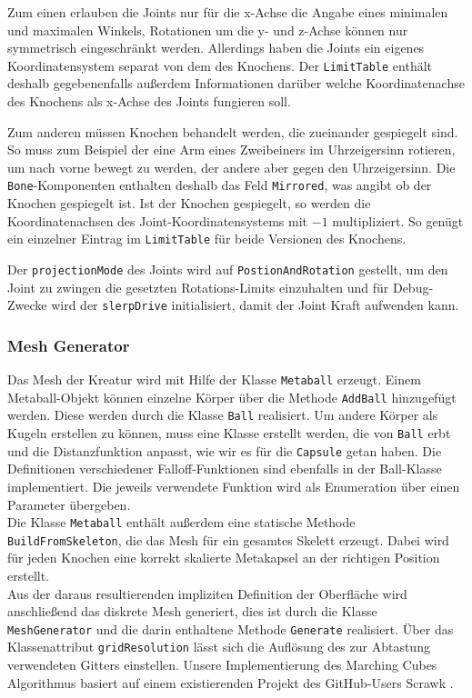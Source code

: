 Zum einen erlauben die Joints nur für die x-Achse die Angabe eines minimalen und maximalen Winkels, Rotationen um die y- und z-Achse können nur symmetrisch eingeschränkt werden.
Allerdings haben die Joints ein eigenes Koordinatensystem separat von dem des Knochens.
Der \texttt{Limit\-Table} enthält deshalb gegebenenfalls außerdem Informationen darüber welche Koordinatenachse des Knochens als x-Achse des Joints fungieren soll.

Zum anderen müssen Knochen behandelt werden, die zueinander gespiegelt sind. So muss zum Beispiel der eine Arm eines Zweibeiners im Uhrzeigersinn rotieren, um nach vorne bewegt zu werden, der andere aber gegen den Uhrzeigersinn. Die \texttt{Bone}-Komponenten enthalten deshalb das Feld \texttt{Mirrored}, was angibt ob der Knochen gespiegelt ist. Ist der Knochen gespiegelt, so werden die Koordinatenachsen des Joint-Koordinatensystems mit \(-1\) multipliziert. So genügt ein einzelner Eintrag im \texttt{Limit\-Table} für beide Versionen des Knochens.

Der \texttt{projectionMode} des Joints wird auf \texttt{Postion\-And\-Rotation} gestellt, um den Joint zu zwingen die gesetzten Rotations-Limits einzuhalten und für Debug-Zwecke wird der \texttt{slerpDrive} initialisiert, damit der Joint Kraft aufwenden kann.

\subsubsection{Mesh Generator}
Das Mesh der Kreatur wird mit Hilfe der Klasse \texttt{Metaball} erzeugt. Einem Metaball-Objekt können einzelne Körper über die Methode \texttt{AddBall} hinzugefügt werden. Diese werden durch die Klasse \texttt{Ball} realisiert. Um andere Körper als Kugeln erstellen zu können, muss eine Klasse erstellt werden, die von \texttt{Ball} erbt und die Distanzfunktion anpasst, wie wir es für die \texttt{Capsule} getan haben. Die Definitionen verschiedener Falloff-Funktionen sind ebenfalls in der Ball-Klasse implementiert. Die jeweils verwendete Funktion wird als Enumeration über einen Parameter übergeben.\\
Die Klasse \texttt{Metaball} enthält außerdem eine statische Methode \texttt{BuildFromSkeleton}, die das Mesh für ein gesamtes Skelett erzeugt. Dabei wird für jeden Knochen eine korrekt skalierte Metakapsel an der richtigen Position erstellt.\\
Aus der daraus resultierenden impliziten Definition der Oberfläche wird anschließend das diskrete Mesh generiert, dies ist durch die Klasse \texttt{MeshGenerator} und die darin enthaltene Methode \texttt{Generate} realisiert. Über das Klassenattribut \texttt{gridResolution} lässt sich die Auflösung des zur Abtastung verwendeten Gitters einstellen. Unsere Implementierung des Marching Cubes Algorithmus basiert auf einem existierenden Projekt des GitHub-Users Scrawk \cite{MarchingCubesImplementation} .

